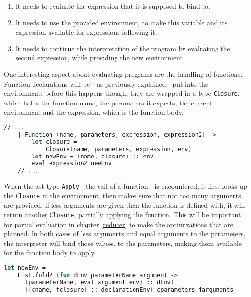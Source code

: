 \begin{enumerate}
    \item It needs to evaluate the expression that it is supposed to bind to.
    \item It needs to use the provided environment, to make this variable and its expression available for expressions following it.
    \item It needs to continue the interpretation of the program by evaluating the second expression, while providing the new environment
\end{enumerate}

One interesting aspect about evaluating programs are the handling of functions. Function declarations will be---as previously explained---put into the environment, before this happens though, they are wrapped in a type \texttt{Closure}, which holds the function name, the parameters it expects, the current environment and the expression, which is the function body.

\begin{lstlisting}[columns=fullflexible, label={interpreter-function_binding}, language=FSharp, caption={Evaluation of function bindings}]
    // ...
    | Function (name, parameters, expression, expression2) ->
        let closure =
            Closure(name, parameters, expression, env)
        let newEnv = (name, closure) :: env
        eval expression2 newEnv
    // ...
\end{lstlisting}

When the \gls{ast} type \texttt{Apply}---the call of a function---is encountered, it first looks up the \texttt{Closure} in the environment, then makes sure that not too many arguments are provided, if less arguments are given then the function is defined with, it will return another \texttt{Closure}, partially applying the function.
This will be important for partial evaluation in chapter \ref{reducer} to make the optimizations that are planned.
In both cases of less arguments and equal arguments to the parameters, the interpreter will bind those values, to the parameters, making them available for the function body to apply.

\begin{lstlisting}[columns=fullflexible, label={interpreter-function_param_binding}, language=FSharp, caption={Binding of arguments and parameters in a function call}]
let newEnv =
    List.fold2 (fun dEnv parameterName argument ->
      (parameterName, eval argument env) :: dEnv)
      ((cname, fclosure) :: declarationEnv) cparameters farguments
\end{lstlisting}

